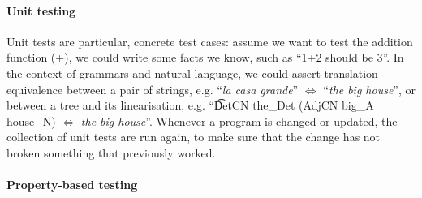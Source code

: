 





\paragraph{Unit testing}

Unit tests are particular, concrete test cases: assume we want to test the
addition function (+), we could write some facts we know, such as
``1+2 should be 3''. In the context of grammars and natural language,
we could assert translation equivalence between a pair of strings,
e.g. ``\emph{la casa grande}'' $\Leftrightarrow$ ``\emph{the big house}'',
or between a tree and its linearisation, e.g. ``\t{DetCN the\_Det
  (AdjCN  big\_A house\_N)} $\Leftrightarrow$ \emph{the big house}''.
Whenever a program is changed or updated, the collection of unit tests
are run again, to make sure that the change has not broken something
that previously worked.

\paragraph{Property-based testing}

